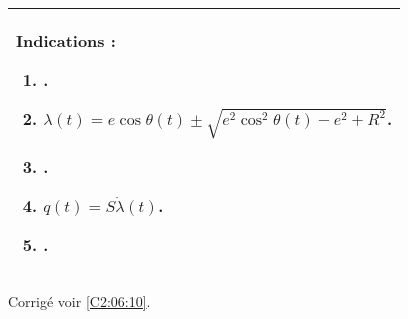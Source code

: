 \ifprof
\else
\footnotesize
\begin{center}
\begin{tabular}{|p{.9\linewidth}|}
\hline
Indications :
\begin{enumerate}
\item .
\item $ \lambda(t)= e\cos\theta(t)\pm \sqrt{e^2\cos^2\theta(t)-e^2+R^2}$.
\item .
\item $q(t)=S\dot{\lambda}(t)$.
\item .
\end{enumerate} \\ \hline
\end{tabular}
\end{center}
\normalsize
\begin{flushright}
\footnotesize{Corrigé  voir \ref{C2:06:10}.}
\end{flushright}%
\fi
